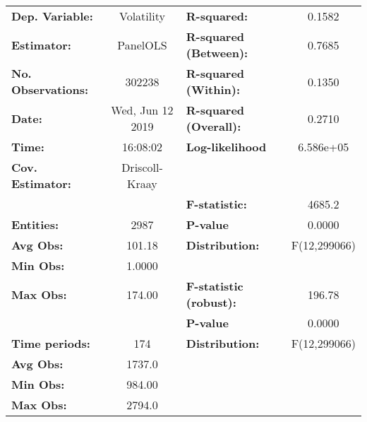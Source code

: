 \begin{center}
\begin{tabular}{lclc}
\toprule
\textbf{Dep. Variable:}                 &     Volatility     & \textbf{  R-squared:         }   &      0.1582      \\
\textbf{Estimator:}                     &      PanelOLS      & \textbf{  R-squared (Between):}  &      0.7685      \\
\textbf{No. Observations:}              &       302238       & \textbf{  R-squared (Within):}   &      0.1350      \\
\textbf{Date:}                          &  Wed, Jun 12 2019  & \textbf{  R-squared (Overall):}  &      0.2710      \\
\textbf{Time:}                          &      16:08:02      & \textbf{  Log-likelihood     }   &    6.586e+05     \\
\textbf{Cov. Estimator:}                &   Driscoll-Kraay   & \textbf{                     }   &                  \\
\textbf{}                               &                    & \textbf{  F-statistic:       }   &      4685.2      \\
\textbf{Entities:}                      &        2987        & \textbf{  P-value            }   &      0.0000      \\
\textbf{Avg Obs:}                       &       101.18       & \textbf{  Distribution:      }   &   F(12,299066)   \\
\textbf{Min Obs:}                       &       1.0000       & \textbf{                     }   &                  \\
\textbf{Max Obs:}                       &       174.00       & \textbf{  F-statistic (robust):} &      196.78      \\
\textbf{}                               &                    & \textbf{  P-value            }   &      0.0000      \\
\textbf{Time periods:}                  &        174         & \textbf{  Distribution:      }   &   F(12,299066)   \\
\textbf{Avg Obs:}                       &       1737.0       & \textbf{                     }   &                  \\
\textbf{Min Obs:}                       &       984.00       & \textbf{                     }   &                  \\
\textbf{Max Obs:}                       &       2794.0       & \textbf{                     }   &                  \\

\end{tabular}
\end{center}
